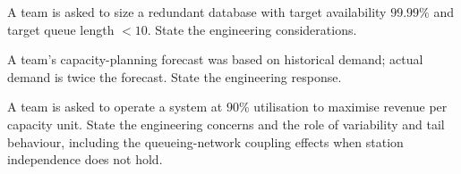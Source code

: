 \begin{exercise}
A team is asked to size a redundant database with target availability $99.99\%$ and target queue length $< 10$. State the engineering considerations.
\end{exercise}

\begin{exercise}
A team's capacity-planning forecast was based on historical demand; actual demand is twice the forecast. State the engineering response.
\end{exercise}

\begin{exercise}
A team is asked to operate a system at $90\%$ utilisation to maximise revenue per capacity unit. State the engineering concerns and the role of variability and tail behaviour, including the queueing-network coupling effects when station independence does not hold.
\end{exercise}
